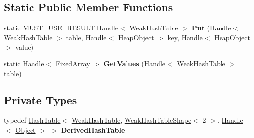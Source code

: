 \subsection*{Static Public Member Functions}
\begin{DoxyCompactItemize}
\item 
static M\+U\+S\+T\+\_\+\+U\+S\+E\+\_\+\+R\+E\+S\+U\+LT \hyperlink{classv8_1_1internal_1_1_handle}{Handle}$<$ \hyperlink{classv8_1_1internal_1_1_weak_hash_table}{Weak\+Hash\+Table} $>$ {\bfseries Put} (\hyperlink{classv8_1_1internal_1_1_handle}{Handle}$<$ \hyperlink{classv8_1_1internal_1_1_weak_hash_table}{Weak\+Hash\+Table} $>$ table, \hyperlink{classv8_1_1internal_1_1_handle}{Handle}$<$ \hyperlink{classv8_1_1internal_1_1_heap_object}{Heap\+Object} $>$ key, \hyperlink{classv8_1_1internal_1_1_handle}{Handle}$<$ \hyperlink{classv8_1_1internal_1_1_heap_object}{Heap\+Object} $>$ value)\hypertarget{classv8_1_1internal_1_1_weak_hash_table_a34d93ba398bf14a45abfbf547eaef232}{}\label{classv8_1_1internal_1_1_weak_hash_table_a34d93ba398bf14a45abfbf547eaef232}

\item 
static \hyperlink{classv8_1_1internal_1_1_handle}{Handle}$<$ \hyperlink{classv8_1_1internal_1_1_fixed_array}{Fixed\+Array} $>$ {\bfseries Get\+Values} (\hyperlink{classv8_1_1internal_1_1_handle}{Handle}$<$ \hyperlink{classv8_1_1internal_1_1_weak_hash_table}{Weak\+Hash\+Table} $>$ table)\hypertarget{classv8_1_1internal_1_1_weak_hash_table_a01008704d0124f7cf85819f6280c37ba}{}\label{classv8_1_1internal_1_1_weak_hash_table_a01008704d0124f7cf85819f6280c37ba}

\end{DoxyCompactItemize}
\subsection*{Private Types}
\begin{DoxyCompactItemize}
\item 
typedef \hyperlink{classv8_1_1internal_1_1_hash_table}{Hash\+Table}$<$ \hyperlink{classv8_1_1internal_1_1_weak_hash_table}{Weak\+Hash\+Table}, \hyperlink{classv8_1_1internal_1_1_weak_hash_table_shape}{Weak\+Hash\+Table\+Shape}$<$ 2 $>$, \hyperlink{classv8_1_1internal_1_1_handle}{Handle}$<$ \hyperlink{classv8_1_1internal_1_1_object}{Object} $>$ $>$ {\bfseries Derived\+Hash\+Table}\hypertarget{classv8_1_1internal_1_1_weak_hash_table_a099f989c8a7b13c13238b17d004785c4}{}\label{classv8_1_1internal_1_1_weak_hash_table_a099f989c8a7b13c13238b17d004785c4}

\end{DoxyCompactItemize}
